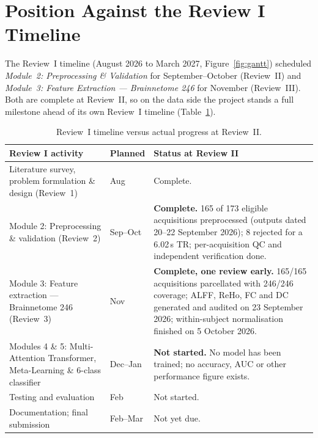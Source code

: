 \documentclass{ssnreview}
\begin{document}
\section{Position Against the Review I Timeline}\label{sec:timeline}

The Review~I timeline (August 2026 to March 2027, Figure~\ref{fig:gantt}) scheduled
\emph{Module~2: Preprocessing \& Validation} for September--October (Review~II) and
\emph{Module~3: Feature Extraction --- Brainnetome 246} for November (Review~III). Both
are complete at Review~II, so on the data side the project stands a full milestone
ahead of its own Review~I timeline (Table~\ref{tab:timeline}).

\begin{table}[!htbp]
\centering
\caption{Review~I timeline versus actual progress at Review~II.}
\label{tab:timeline}
\small
\begin{tabularx}{\textwidth}{@{}>{\raggedright\arraybackslash}p{5.0cm}>{\raggedright\arraybackslash}p{1.9cm}X@{}}
\toprule
\textbf{Review I activity} & \textbf{Planned} & \textbf{Status at Review II} \\
\midrule
Literature survey, problem formulation \& design (Review~1) & Aug & Complete. \\
Module 2: Preprocessing \& validation (Review~2) & Sep--Oct &
\textbf{Complete.} 165 of 173 eligible acquisitions preprocessed (outputs dated 20--22
September 2026); 8 rejected for a 6.02\,s TR; per-acquisition QC and independent
verification done. \\
Module 3: Feature extraction --- Brainnetome 246 (Review~3) & Nov &
\textbf{Complete, one review early.} 165/165 acquisitions parcellated with 246/246
coverage; ALFF, ReHo, FC and DC generated and audited on 23 September 2026;
within-subject normalisation finished on 5 October 2026. \\
Modules 4 \& 5: Multi-Attention Transformer, Meta-Learning \& 6-class classifier &
Dec--Jan & \textbf{Not started.} No model has been trained; no accuracy, AUC or other
performance figure exists. \\
Testing and evaluation & Feb & Not started. \\
Documentation; final submission & Feb--Mar & Not yet due. \\
\bottomrule
\end{tabularx}
\end{table}
\end{document}
